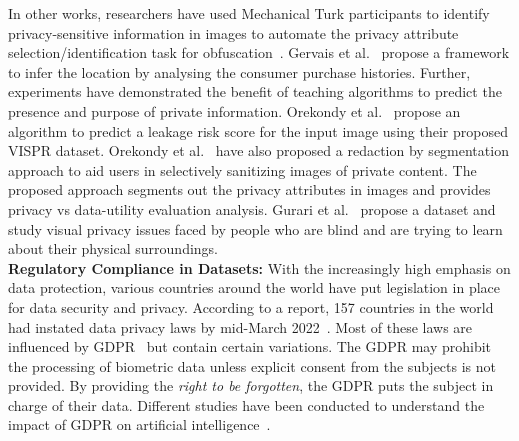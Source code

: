\documentclass[journal]{IEEEtran}
\begin{document}
In other works, researchers have used Mechanical Turk participants to identify privacy-sensitive information in images to automate the privacy attribute selection/identification task for obfuscation~\cite{li2018human}. Gervais et al.~\cite{gervais2016quantifying} propose a framework to infer the location by analysing the consumer purchase histories. Further, experiments have demonstrated the benefit of teaching algorithms to predict the presence and purpose of private information. Orekondy et al.~\cite{orekondy2017towards} propose an algorithm to predict a leakage risk score for the input image using their proposed VISPR dataset. Orekondy et al.~\cite{orekondy2018connecting} have also proposed a redaction by segmentation approach to aid users in selectively sanitizing images of private content. The proposed approach segments out the privacy attributes in images and provides privacy vs data-utility evaluation analysis. Gurari et al.~\cite{gurari2019vizwiz} propose a dataset and study visual privacy issues faced by people who are blind and are trying to learn about their physical surroundings. \\
% 

\noindent \textbf{Regulatory Compliance in Datasets:} With the increasingly high emphasis on data protection, various countries around the world have put legislation in place for data security and privacy. According to a report, 157 countries in the world had instated data privacy laws by mid-March 2022~\cite{unctad, greenleaf2021global, greenleaf2022now}. Most of these laws are influenced by GDPR~\cite{regulation2016regulation} but contain certain variations.
The GDPR may prohibit the processing of biometric data unless explicit consent from the subjects is not provided. By providing the \textit{right to be forgotten}, the GDPR puts the subject in charge of their data. Different studies have been conducted to understand the impact of GDPR on artificial intelligence~\cite{forti2021deployment, goldsteen2021data}. 
\end{document}
